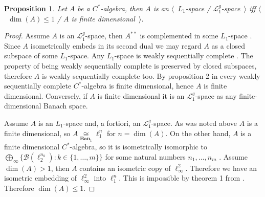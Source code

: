 \documentclass[12pt]{article}
\newtheorem{proposition}[theorem]{Proposition}
\newcommand{\isom}[1]{\mathop{\mathbin{\cong}}\limits_{#1}}
\begin{document}
\begin{proposition}\label{CStarAlgIsL1IfFinDim} Let $A$ be a $C^*$-algebra, then $A$ is an $\langle$~$L_1$-space / $\mathcal{L}_1^g$-space~$\rangle$ iff $\langle$~$\operatorname{dim}(A)\leq 1$ / $A$ is finite dimensional~$\rangle$.
\end{proposition}
\begin{proof} Assume $A$ is an $\mathcal{L}_1^g$-space, then $A^{**}$ is complemented in some $L_1$-space \cite[corollary 23.2.1(2)]{DefFloTensNorOpId}. Since $A$ isometrically embeds in its second dual we may regard $A$ as a closed subspace of some $L_1$-space. Any $L_1$-space is weakly sequentially complete \cite[corollary III.C.14]{WojBanSpForAnalysts}. The property of being weakly sequentially complete is preserved by closed subspaces, therefore $A$ is weakly sequentially complete too. By proposition 2 in \cite{SakWeakCompOpOnOpAlg} every weakly sequentially complete $C^*$-algebra is finite dimensional, hence $A$ is finite dimensional. Conversely, if $A$ is finite dimensional it is an $\mathcal{L}_1^g$-space as any finite-dimensional Banach space.

Assume $A$ is an $L_1$-space and, a fortiori, an $\mathcal{L}_1^g$-space. As was noted above $A$ is a finite dimensional, so $A\isom{\mathbf{Ban}_1}\ell_1^n$ for $n=\operatorname{dim}(A)$. On the other hand, $A$ is a finite dimensional $C^*$-algebra, so it is isometrically isomorphic to $\bigoplus_\infty\{ \mathcal{B}(\ell_2^{n_k}):k\in\{1,\ldots,m\}\}$ for some natural numbers $n_1,\ldots,n_m$ \cite[theorem III.1.1]{DavCSatrAlgByExmpl}. Assume $\operatorname{dim}(A)>1$, then $A$ contains an isometric copy of $\ell_\infty^2$. Therefore we have an isometric embedding of $\ell_\infty^2$ into $\ell_1^n$. This is impossible by theorem 1 from \cite{LyubIsomEmdbFinDimLp}. Therefore $\operatorname{dim}(A)\leq 1$.
\end{proof}
\end{document}
